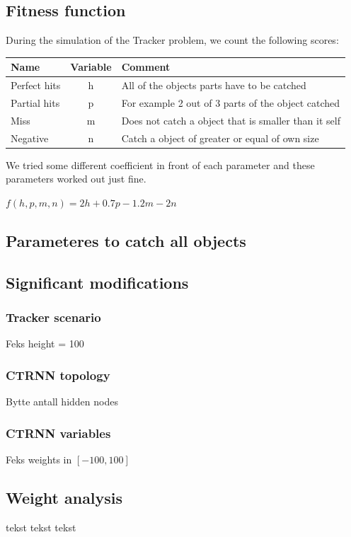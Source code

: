 \subsection{Fitness function}
During the simulation of the Tracker problem, we count the following scores:

\begin{tabular}{l | c | l}
\textbf{Name} & \textbf{Variable} & \textbf{Comment} \\
\hline
Perfect hits & h & All of the objects parts have to be catched \\
Partial hits & p & For example 2 out of 3 parts of the object catched \\
Miss & m & Does not catch a object that is smaller than it self \\
Negative & n & Catch a object of greater or equal of own size \\
\hline
\end{tabular}

We tried some different coefficient in front of each parameter and these parameters worked out just fine.

\begin{center}
$f(h,p,m,n) = 2h + 0.7p - 1.2m - 2n$
\end{center}


\subsection{Parameteres to catch all objects}


\subsection{Significant modifications}
\subsubsection{Tracker scenario}
Feks height = 100

\subsubsection{CTRNN topology}
Bytte antall hidden nodes

\subsubsection{CTRNN variables}
Feks weights in $[-100, 100]$

\subsection{Weight analysis}
tekst tekst tekst

